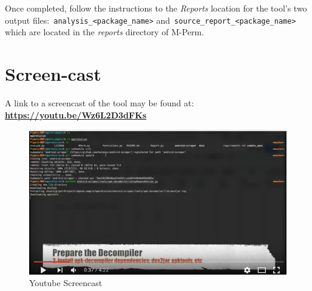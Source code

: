 \documentclass{sig-alternate-05-2015}
\begin{document}
\begin{enumerate}
Once completed, follow the instructions to the \emph{Reports} location for the tool's two output files:~\texttt{analysis\_<package\_name>} and~\texttt{source\_report\_<package\_name>} which are located in the \emph{reports} directory of M-Perm.

	
	
	
\end{enumerate}



\section{Screen-cast}

\noindent
A link to a screencast of the tool may be found at: \\
\textbf{\url{https://youtu.be/Wz6L2D3dFKs}}



\begin{figure}[h]
\centering
\includegraphics[width=\columnwidth, angle = 0, scale=.99]{images/screencast/youtube.png}
\caption{Youtube Screencast}
\label{fig:youtbuescreencast}
\end{figure}






\end{document}
